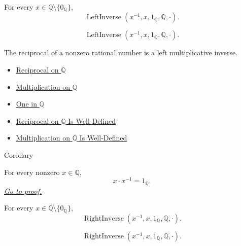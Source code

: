 \begin{remark*}
For every $x\in\mathbb{Q}\setminus\{0_{\mathbb{Q}}\}$,
\[
\operatorname{LeftInverse}(x^{-1},x,1_{\mathbb{Q}},\mathbb{Q},\cdot).
\]
\end{remark*}

\begin{remark*}
\[
\operatorname{LeftInverse}(x^{-1},x,1_{\mathbb{Q}},\mathbb{Q},\cdot).
\]
\end{remark*}

\begin{remark*}[Interpretation]
The reciprocal of a nonzero rational number is a left multiplicative inverse.
\end{remark*}

\begin{dependencies}
\begin{itemize}
  \item \hyperref[def:reciprocal-on-q-classes]{Reciprocal on $\mathbb{Q}$}
  \item \hyperref[def:multiplication-on-q-classes]{Multiplication on $\mathbb{Q}$}
  \item \hyperref[def:one-in-q]{One in $\mathbb{Q}$}
  \item \hyperref[thm:reciprocal-on-q-well-defined]{Reciprocal on $\mathbb{Q}$ Is Well-Defined}
  \item \hyperref[thm:multiplication-on-q-well-defined]{Multiplication on $\mathbb{Q}$ Is Well-Defined}
\end{itemize}
\end{dependencies}

\begin{corollarybox}{Corollary}
\begin{corollary}
\label{cor:reciprocal-right-multiplicative-inverse-on-q}
For every nonzero $x\in\mathbb{Q}$,
\[
x\cdot x^{-1}=1_{\mathbb{Q}}.
\]
\hyperref[prf:reciprocal-right-multiplicative-inverse-on-q]{\textit{Go to proof.}}
\end{corollary}
\end{corollarybox}

\begin{remark*}
For every $x\in\mathbb{Q}\setminus\{0_{\mathbb{Q}}\}$,
\[
\operatorname{RightInverse}(x^{-1},x,1_{\mathbb{Q}},\mathbb{Q},\cdot).
\]
\end{remark*}

\begin{remark*}
\[
\operatorname{RightInverse}(x^{-1},x,1_{\mathbb{Q}},\mathbb{Q},\cdot).
\]
\end{remark*}

